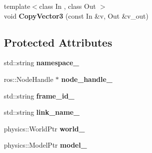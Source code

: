 \begin{DoxyCompactItemize}
\item 
\hypertarget{classgazebo_1_1_gazebo_blimp_wrench_plugin_a18dca12127345776b9e966f18c72b4a7}{{\footnotesize template$<$class In , class Out $>$ }\\void {\bfseries Copy\-Vector3} (const In \&v, Out \&v\-\_\-out)}\label{classgazebo_1_1_gazebo_blimp_wrench_plugin_a18dca12127345776b9e966f18c72b4a7}

\end{DoxyCompactItemize}
\subsection*{Protected Attributes}
\begin{DoxyCompactItemize}
\item 
\hypertarget{classgazebo_1_1_gazebo_blimp_wrench_plugin_adf20fff77602405801e8e77ed9e71610}{std\-::string {\bfseries namespace\-\_\-}}\label{classgazebo_1_1_gazebo_blimp_wrench_plugin_adf20fff77602405801e8e77ed9e71610}

\item 
\hypertarget{classgazebo_1_1_gazebo_blimp_wrench_plugin_a8ed3db7f6b880c673c94836a233f6b69}{ros\-::\-Node\-Handle $\ast$ {\bfseries node\-\_\-handle\-\_\-}}\label{classgazebo_1_1_gazebo_blimp_wrench_plugin_a8ed3db7f6b880c673c94836a233f6b69}

\item 
\hypertarget{classgazebo_1_1_gazebo_blimp_wrench_plugin_a517958c3b6872922667d790230f8a3f8}{std\-::string {\bfseries frame\-\_\-id\-\_\-}}\label{classgazebo_1_1_gazebo_blimp_wrench_plugin_a517958c3b6872922667d790230f8a3f8}

\item 
\hypertarget{classgazebo_1_1_gazebo_blimp_wrench_plugin_ad7020cd6f546ff529e524c54dc0bb7f5}{std\-::string {\bfseries link\-\_\-name\-\_\-}}\label{classgazebo_1_1_gazebo_blimp_wrench_plugin_ad7020cd6f546ff529e524c54dc0bb7f5}

\item 
\hypertarget{classgazebo_1_1_gazebo_blimp_wrench_plugin_aecdbcdba82e2de9cc92ce80035e40dfc}{physics\-::\-World\-Ptr {\bfseries world\-\_\-}}\label{classgazebo_1_1_gazebo_blimp_wrench_plugin_aecdbcdba82e2de9cc92ce80035e40dfc}

\item 
\hypertarget{classgazebo_1_1_gazebo_blimp_wrench_plugin_afe1ee435ae12574f11b61620189f4937}{physics\-::\-Model\-Ptr {\bfseries model\-\_\-}}\label{classgazebo_1_1_gazebo_blimp_wrench_plugin_afe1ee435ae12574f11b61620189f4937}


\end{DoxyCompactItemize}
